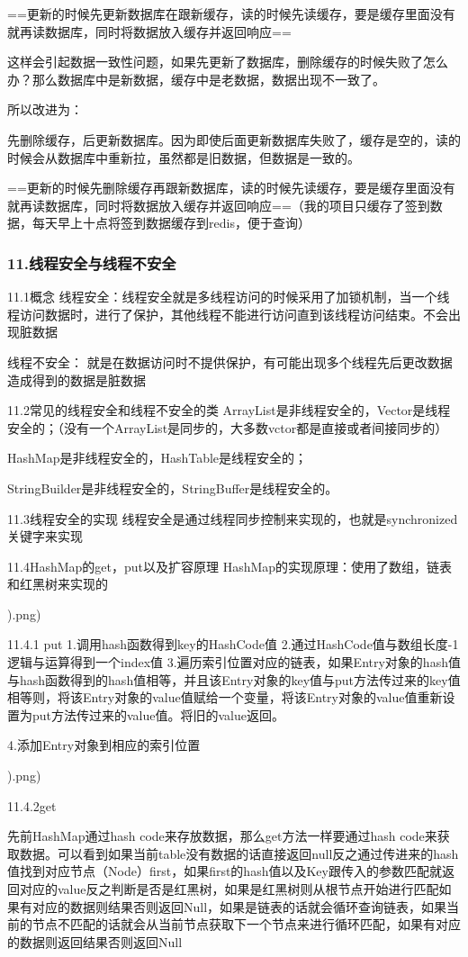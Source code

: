 \documentclass[UTF8]{ctexart}
\begin{document}
==更新的时候先更新数据库在跟新缓存，读的时候先读缓存，要是缓存里面没有就再读数据库，同时将数据放入缓存并返回响应==

这样会引起数据一致性问题，如果先更新了数据库，删除缓存的时候失败了怎么办？那么数据库中是新数据，缓存中是老数据，数据出现不一致了。

所以改进为：

先删除缓存，后更新数据库。因为即使后面更新数据库失败了，缓存是空的，读的时候会从数据库中重新拉，虽然都是旧数据，但数据是一致的。

==更新的时候先删除缓存再跟新数据库，读的时候先读缓存，要是缓存里面没有就再读数据库，同时将数据放入缓存并返回响应==（我的项目只缓存了签到数据，每天早上十点将签到数据缓存到redis，便于查询）

\subsubsection{11.线程安全与线程不安全}
11.1概念
线程安全：线程安全就是多线程访问的时候采用了加锁机制，当一个线程访问数据时，进行了保护，其他线程不能进行访问直到该线程访问结束。不会出现脏数据

线程不安全： 就是在数据访问时不提供保护，有可能出现多个线程先后更改数据造成得到的数据是脏数据

11.2常见的线程安全和线程不安全的类
ArrayList是非线程安全的，Vector是线程安全的；（没有一个ArrayList是同步的，大多数vctor都是直接或者间接同步的）

HashMap是非线程安全的，HashTable是线程安全的；

StringBuilder是非线程安全的，StringBuffer是线程安全的。

11.3线程安全的实现
线程安全是通过线程同步控制来实现的，也就是synchronized关键字来实现

11.4HashMap的get，put以及扩容原理
HashMap的实现原理：使用了数组，链表和红黑树来实现的

).png)

11.4.1 put
1.调用hash函数得到key的HashCode值
2.通过HashCode值与数组长度-1逻辑与运算得到一个index值
3.遍历索引位置对应的链表，如果Entry对象的hash值与hash函数得到的hash值相等，并且该Entry对象的key值与put方法传过来的key值相等则，将该Entry对象的value值赋给一个变量，将该Entry对象的value值重新设置为put方法传过来的value值。将旧的value返回。

4.添加Entry对象到相应的索引位置

).png)

11.4.2get

先前HashMap通过hash code来存放数据，那么get方法一样要通过hash code来获取数据。可以看到如果当前table没有数据的话直接返回null反之通过传进来的hash值找到对应节点（Node）first，如果first的hash值以及Key跟传入的参数匹配就返回对应的value反之判断是否是红黑树，如果是红黑树则从根节点开始进行匹配如果有对应的数据则结果否则返回Null，如果是链表的话就会循环查询链表，如果当前的节点不匹配的话就会从当前节点获取下一个节点来进行循环匹配，如果有对应的数据则返回结果否则返回Null
\end{document}

